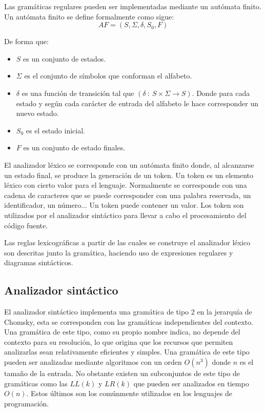 Las gramáticas regulares pueden ser implementadas mediante un autómata finito. Un autómata finito se define formalmente como sigue:
$$AF = (S,\Sigma,\delta,S_0,F)$$

De forma que:
\begin{itemize}
\item $S$ es un conjunto de estados.
\item $\Sigma$ es el conjunto de símbolos que conforman el alfabeto.
\item $\delta$ es una función de transición tal que $(\delta\ :\ S\times\Sigma \rightarrow S)$. Donde para cada estado y según 
cada carácter de entrada del alfabeto le hace corresponder un nuevo estado.
\item $S_0$ es el estado inicial.
\item $F$ es un conjunto de estado finales.
\end{itemize}

El analizador léxico se corresponde con un autómata finito donde, al alcanzarse un estado final, se produce la generación de un token.
Un token es un elemento léxico con cierto valor para el lenguaje. Normalmente se corresponde con una cadena de
caracteres que se puede corresponder con una palabra reservada, un identificador, un número... Un token puede contener un 
valor. Los token son utilizados por el analizador sintáctico para llevar a cabo el procesamiento del código fuente. 

Las reglas lexicográficas a partir de las cuales se construye el analizador léxico son descritas junto la gramática, haciendo uso
de expresiones regulares y diagramas sintácticos.

\subsection{Analizador sintáctico}
El analizador sintáctico implementa una gramática de tipo 2 en la jerarquía de Chomsky, esta se corresponden con las 
gramáticas independientes del contexto. Una gramática de este tipo, como su propio nombre indica, no depende del contexto para
su resolución, lo que origina que los recursos que permiten analizarlas sean relativamente eficientes y simples. Una gramática de
este tipo pueden ser analizadas mediante algoritmos con un orden $O(n^3)$ donde $n$ es el tamaño de la entrada. No obstante existen 
un subconjuntos de este tipo de gramáticas como las $LL(k)$ y $LR(k)$ que pueden ser analizados en tiempo $O(n)$. Estos últimos son los
comúnmente utilizados en los lenguajes de programación.


